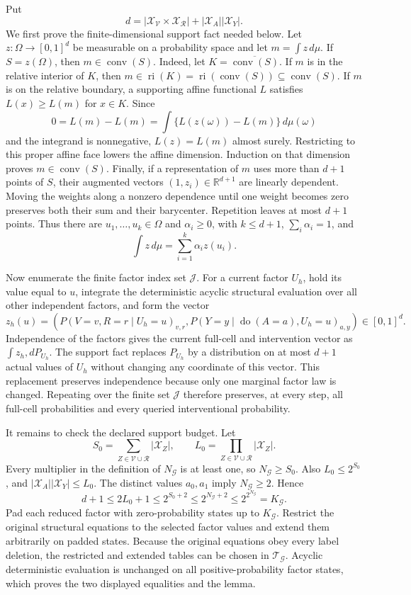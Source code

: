Put
\[
d=\left|\mathcal X_{\mathcal V}\times\mathcal X_{\mathcal R}\right|+
|\mathcal X_A||\mathcal X_Y|.
\]
We first prove the finite-dimensional support fact needed below. Let \(z:\Omega\to[0,1]^d\) be measurable on a probability space and let \(m=\int z\,d\mu\). If \(S=z(\Omega)\), then \(m\in\operatorname{conv}(S)\). Indeed, let \(K=\overline{\operatorname{conv}(S)}\). If \(m\) is in the relative interior of \(K\), then \(m\in\operatorname{ri}(K)=\operatorname{ri}(\operatorname{conv}(S))\subseteq\operatorname{conv}(S)\). If \(m\) is on the relative boundary, a supporting affine functional \(L\) satisfies \(L(x)\geq L(m)\) for \(x\in K\). Since
\[
0=L(m)-L(m)=\int\{L(z(\omega))-L(m)\}\,d\mu(\omega)
\]
and the integrand is nonnegative, \(L(z)=L(m)\) almost surely. Restricting to this proper affine face lowers the affine dimension. Induction on that dimension proves \(m\in\operatorname{conv}(S)\). Finally, if a representation of \(m\) uses more than \(d+1\) points of \(S\), their augmented vectors \((1,z_i)\in\mathbb R^{d+1}\) are linearly dependent. Moving the weights along a nonzero dependence until one weight becomes zero preserves both their sum and their barycenter. Repetition leaves at most \(d+1\) points. Thus there are \(u_1,\ldots,u_k\in\Omega\) and \(\alpha_i\geq0\), with \(k\leq d+1\), \(\sum_i\alpha_i=1\), and
\[
\int z\,d\mu=\sum_{i=1}^k\alpha_i z(u_i).
\]

Now enumerate the finite factor index set \(\mathcal J\). For a current factor \(U_h\), hold its value equal to \(u\), integrate the deterministic acyclic structural evaluation over all other independent factors, and form the vector
\[
z_h(u)=\left(
P(V=v,R=r\mid U_h=u)_{v,r},
P(Y=y\mid\operatorname{do}(A=a),U_h=u)_{a,y}
\right)\in[0,1]^d.
\]
Independence of the factors gives the current full-cell and intervention vector as \(\int z_h,dP_{U_h}\). The support fact replaces \(P_{U_h}\) by a distribution on at most \(d+1\) actual values of \(U_h\) without changing any coordinate of this vector. This replacement preserves independence because only one marginal factor law is changed. Repeating over the finite set \(\mathcal J\) therefore preserves, at every step, all full-cell probabilities and every queried interventional probability.

It remains to check the declared support budget. Let
\[
S_0=\sum_{Z\in\mathcal V\cup\mathcal R}|\mathcal X_Z|,
\qquad
L_0=\prod_{Z\in\mathcal V\cup\mathcal R}|\mathcal X_Z|.
\]
Every multiplier in the definition of \(N_{\mathcal G}\) is at least one, so \(N_{\mathcal G}\geq S_0\). Also \(L_0\leq2^{S_0}\), and \(|\mathcal X_A||\mathcal X_Y|\leq L_0\). The distinct values \(a_0,a_1\) imply \(N_{\mathcal G}\geq2\). Hence
\[
d+1\leq2L_0+1\leq2^{S_0+2}
\leq2^{N_{\mathcal G}+2}
\leq2^{2^{N_{\mathcal G}}}=K_{\mathcal G}.
\]
Pad each reduced factor with zero-probability states up to \(K_{\mathcal G}\). Restrict the original structural equations to the selected factor values and extend them arbitrarily on padded states. Because the original equations obey every label deletion, the restricted and extended tables can be chosen in \(\mathcal T_{\mathcal G}\). Acyclic deterministic evaluation is unchanged on all positive-probability factor states, which proves the two displayed equalities and the lemma.